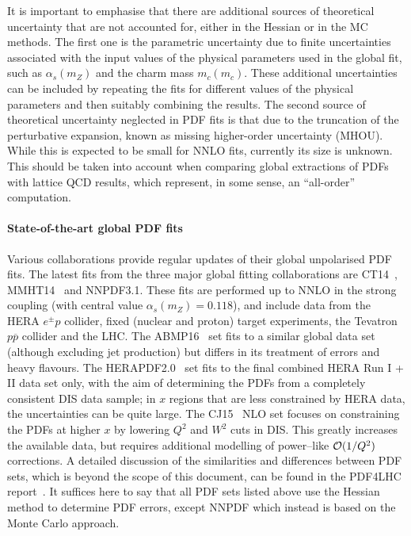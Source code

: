 It is important to emphasise that there are additional sources of theoretical
uncertainty that are not accounted for, either in the Hessian or
in the MC methods.
%
The first one is the parametric uncertainty due to finite uncertainties associated
with the input values of the physical parameters used in the global fit, such
as $\alpha_s(m_Z)$ and the charm mass $m_c(m_c)$.
%
These additional uncertainties can be included by repeating the fits for different values of the
physical parameters and then suitably combining the results.
%
The second source of theoretical uncertainty neglected in PDF fits
is that due to the truncation of the perturbative expansion, known
as missing higher-order uncertainty (MHOU).
%
While this is expected to be small for NNLO fits, currently its size is unknown.
This should be taken into account when comparing global extractions of PDFs with lattice
QCD results, which represent, in some sense, an ``all-order'' computation.

\paragraph{State-of-the-art global PDF fits}
%
Various collaborations provide regular updates of their global unpolarised
PDF fits.
%
The latest fits from the three major global fitting collaborations
are CT14~\cite{Dulat:2015mca}, MMHT14~\cite{Harland-Lang:2014zoa} and NNPDF3.1.
%
These fits are performed up to NNLO in the strong coupling (with central value
$\alpha_s(m_Z)=0.118$),
and include data from the HERA $e^{\pm} p$ collider, fixed (nuclear and proton) target experiments, the Tevatron $p\overline{p}$ collider and the LHC. 
%
The ABMP16~\cite{Alekhin:2017kpj} set fits to a similar global data set
(although excluding jet production)
but differs in its treatment of errors and heavy flavours.
%
The HERAPDF2.0~\cite{Abramowicz:2015mha} set fits to the final combined HERA Run I + II data set only, with the aim of determining the PDFs from a completely consistent DIS data sample; in $x$ regions that are less constrained by HERA data, the uncertainties can be quite large. The CJ15~\cite{Accardi:2016qay} NLO set focuses on constraining the PDFs at higher $x$ by lowering $Q^2$ and $W^2$ cuts in DIS. This greatly increases the available data, but requires additional modelling of power--like ${\cal O}(1/Q^2)$ corrections.
%
A detailed discussion of the similarities and differences between
PDF sets, which is beyond the scope of this document,
can be found in the PDF4LHC report~\cite{Butterworth:2015oua}.
%
It suffices here to say that all PDF sets listed above use the Hessian
method to determine PDF errors, except NNPDF which instead
is based on the Monte Carlo approach.

